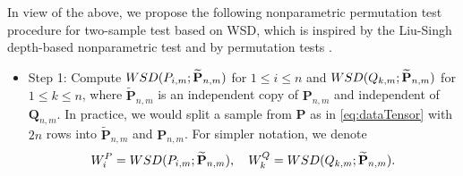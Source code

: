 \documentclass{imsart}
\numberwithin{equation}{section}
\begin{document}
In view of the above, we propose the following nonparametric permutation test procedure for two-sample test based on WSD, which is inspired by the Liu-Singh depth-based nonparametric test \cite{liu1993quality} and by permutation tests \cite{pitman1937significance}. 
\begin{itemize}
	\item Step 1: Compute $\rm{WSD}(P_{i,m}; \widetilde{\mathbf{P}}_{n,m})$ for $1\leq i\leq n$ and $\rm{WSD}(Q_{k,m}; \widetilde{\mathbf{P}}_{n,m})$ for $1\leq k\leq n$, where $\widetilde{\mathbf{P}}_{n,m}$ is an independent copy of $\mathbf{P}_{n,m}$ and independent of $\mathbf{Q}_{n,m}$. 
	In practice, we would split a sample from $\mathbf{P}$
	as in \eqref{eq:dataTensor}
	with $2n$ rows into $\widetilde{\mathbf{P}}_{n,m}$ and $\mathbf{P}_{n,m}$. 
	For simpler notation, we denote 
	\begin{equation*}
		W^P_i = \rm{WSD}(P_{i,m}; \widetilde{\mathbf{P}}_{n,m}), \quad W^Q_k = \rm{WSD}(Q_{k,m}; \widetilde{\mathbf{P}}_{n,m}).
	\end{equation*}
	

\end{itemize}
\end{document}
